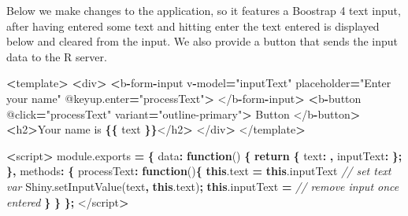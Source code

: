 \documentclass[
]{krantz}
\makeatletter
\newenvironment{Shaded}{\begin{snugshade}}{\end{snugshade}}
\newcommand{\AttributeTok}[1]{\textcolor[rgb]{0.61,0.61,0.61}{#1}}
\newcommand{\CommentTok}[1]{\textcolor[rgb]{0.37,0.37,0.37}{\textit{#1}}}
\newcommand{\ControlFlowTok}[1]{\textcolor[rgb]{0.27,0.27,0.27}{\textbf{#1}}}
\newcommand{\DataTypeTok}[1]{\textcolor[rgb]{0.27,0.27,0.27}{#1}}
\newcommand{\KeywordTok}[1]{\textcolor[rgb]{0.27,0.27,0.27}{\textbf{#1}}}
\newcommand{\NormalTok}[1]{#1}
\newcommand{\OperatorTok}[1]{\textcolor[rgb]{0.43,0.43,0.43}{\textbf{#1}}}
\newcommand{\StringTok}[1]{\textcolor[rgb]{0.5,0.5,0.5}{#1}}
\newcommand{\VariableTok}[1]{\textcolor[rgb]{0,0,0}{#1}}
\newenvironment{kframe}{%
\medskip{}
\setlength{\fboxsep}{.8em}
 \def\at@end@of@kframe{}%
 \ifinner\ifhmode%
  \def\at@end@of@kframe{\end{minipage}}%
  \begin{minipage}{\columnwidth}%
 \fi\fi%
 \def\FrameCommand##1{\hskip\@totalleftmargin \hskip-\fboxsep
 \colorbox{shadecolor}{##1}\hskip-\fboxsep
     \hskip-\linewidth \hskip-\@totalleftmargin \hskip\columnwidth}%
 \MakeFramed {\advance\hsize-\width
   \@totalleftmargin\z@ \linewidth\hsize
   \@setminipage}}%
 {\par\unskip\endMakeFramed%
 \at@end@of@kframe}
\renewenvironment{Shaded}{\begin{kframe}}{\end{kframe}}
\makeatother
\begin{document}
Below we make changes to the application, so it features a Boostrap 4 text input, after having entered some text and hitting enter the text entered is displayed below and cleared from the input. We also provide a button that sends the input data to the R server.

\begin{Shaded}
\begin{Highlighting}[]
\OperatorTok{<}\NormalTok{template}\OperatorTok{>}
  \OperatorTok{<}\NormalTok{div}\OperatorTok{>}
    \OperatorTok{<}\NormalTok{b}\OperatorTok{{-}}\NormalTok{form}\OperatorTok{{-}}\NormalTok{input }
\NormalTok{      v}\OperatorTok{{-}}\NormalTok{model}\OperatorTok{=}\StringTok{"inputText"} 
\NormalTok{      placeholder}\OperatorTok{=}\StringTok{"Enter your name"} 
\NormalTok{      @}\VariableTok{keyup}\NormalTok{.}\AttributeTok{enter}\OperatorTok{=}\StringTok{"processText"}\OperatorTok{>}
\NormalTok{    </b}\OperatorTok{{-}}\NormalTok{form}\OperatorTok{{-}}\NormalTok{input}\OperatorTok{>}
    \OperatorTok{<}\NormalTok{b}\OperatorTok{{-}}\NormalTok{button }
\NormalTok{      @click}\OperatorTok{=}\StringTok{"processText"} 
\NormalTok{      variant}\OperatorTok{=}\StringTok{"outline{-}primary"}\OperatorTok{>}
\NormalTok{      Button}
\NormalTok{    </b}\OperatorTok{{-}}\NormalTok{button}\OperatorTok{>}
    \OperatorTok{<}\NormalTok{h2}\OperatorTok{>}\NormalTok{Your name is }\OperatorTok{\{\{}\NormalTok{ text }\OperatorTok{\}\}}\NormalTok{</h2}\OperatorTok{>}
\NormalTok{  </div}\OperatorTok{>}
\NormalTok{</template}\OperatorTok{>}

\OperatorTok{<}\NormalTok{script}\OperatorTok{>}
\VariableTok{module}\NormalTok{.}\AttributeTok{exports} \OperatorTok{=} \OperatorTok{\{}
  \DataTypeTok{data}\OperatorTok{:} \KeywordTok{function}\NormalTok{() }\OperatorTok{\{}
    \ControlFlowTok{return} \OperatorTok{\{}
      \DataTypeTok{text}\OperatorTok{:} \StringTok{\textquotesingle{}\textquotesingle{}}\OperatorTok{,}
      \DataTypeTok{inputText}\OperatorTok{:} \StringTok{\textquotesingle{}\textquotesingle{}}
    \OperatorTok{\};}
  \OperatorTok{\},}
  \DataTypeTok{methods}\OperatorTok{:} \OperatorTok{\{}
    \DataTypeTok{processText}\OperatorTok{:} \KeywordTok{function}\NormalTok{()}\OperatorTok{\{}
      \KeywordTok{this}\NormalTok{.}\AttributeTok{text} \OperatorTok{=} \KeywordTok{this}\NormalTok{.}\AttributeTok{inputText} \CommentTok{// set text var}
      \VariableTok{Shiny}\NormalTok{.}\AttributeTok{setInputValue}\NormalTok{(}\StringTok{\textquotesingle{}text\textquotesingle{}}\OperatorTok{,} \KeywordTok{this}\NormalTok{.}\AttributeTok{text}\NormalTok{)}\OperatorTok{;}
      \KeywordTok{this}\NormalTok{.}\AttributeTok{inputText} \OperatorTok{=} \StringTok{\textquotesingle{}\textquotesingle{}} \CommentTok{// remove input once entered}
    \OperatorTok{\}}
  \OperatorTok{\}}
\OperatorTok{\};}
\NormalTok{</script}\OperatorTok{>}
\end{Highlighting}
\end{Shaded}
\end{document}
